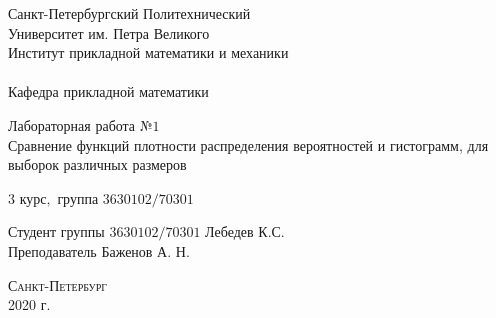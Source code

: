 \documentclass[a4]{article}
\begin{document}
\def\contentsname{\LARGE{Содержание}}
\thispagestyle{empty}
\begin{center} 

\vspace{2cm} 
{\Large \sc Санкт-Петербургский Политехнический}\\
\vspace{2mm}
{\Large \sc Университет} им. {\Large\sc Петра Великого}\\
\vspace{1cm}
{\large \sc Институт прикладной математики и механики\\ 
\vspace{0.5mm}
\textsc{}}\\ 
\vspace{0.5mm}
{\large\sc Кафедра прикладной математики}\\
\vspace{15mm}


{\huge \sc Лабораторная работа №$1$\\
 Сравнение функций плотности распределения вероятностей и гистограмм, для выборок различных размеров
\vspace{6mm}

 }
\vspace*{2mm}


\vspace{1cm}

{\sc $3$ курс$,$ группа $3630102/70301$}

\vspace{2cm} 
Студент группы $3630102/70301$ \hfill Лебедев К.С.\\
\vspace{1cm}
Преподаватель \hfill Баженов А. Н.\\
\vspace{20mm} 

\end{center} 
\begin{center}
\vfill {\large\textsc{Санкт-Петербург}}\\ 
2020 г.
\end{center}
\end{document}
